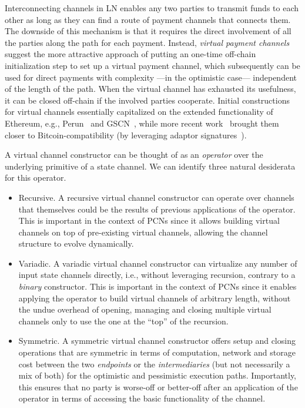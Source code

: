 Interconnecting channels in LN enables any two parties to transmit funds
to each other as long as they can find a route of payment channels that connects
them. The downside of this mechanism is that it requires the direct involvement
of all the parties along the path for each payment. Instead, \emph{virtual payment
channels} suggest the more attractive approach of putting an one-time off-chain
initialization step to set up a virtual payment channel, which subsequently can
be used for direct payments with complexity ---in the optimistic case---
independent of the length of the path. When the virtual channel has exhausted
its usefulness, it can be closed off-chain if the involved parties cooperate.
Initial constructions for virtual channels essentially capitalized on the extended functionality of Ethereum, e.g.,
Perun~\cite{perun} and GSCN~\cite{DBLP:conf/ccs/DziembowskiFH18}, while more
recent work~\cite{9519487} brought them closer to
Bitcoin-compatibility (by leveraging adaptor
signatures~\cite{DBLP:journals/iacr/AumayrEEFHMMR20}).

A virtual channel constructor can be thought of as an \emph{operator} over the
underlying primitive of a state channel. We can identify three natural
desiderata for this operator.

\begin{itemize}
\item Recursive. A recursive virtual channel constructor can operate over
channels that themselves could be the results of previous applications of the
operator. This is important in the context of PCNs since it allows building
virtual channels on top of pre-existing virtual channels, allowing the channel
structure to evolve dynamically.
\item Variadic. A variadic virtual channel constructor can virtualize any number
of input state channels directly, i.e., without leveraging recursion, contrary to a \emph{binary} constructor. This is
important in the context of PCNs since it enables applying the operator to build
virtual channels of arbitrary length, without the undue overhead of opening,
managing and closing multiple virtual channels only to use the one at the
``top'' of the recursion.
\item Symmetric. A symmetric virtual channel constructor offers setup and
closing operations that are symmetric in terms of computation, network and storage cost between the two
\emph{endpoints} or the \emph{intermediaries} (but not necessarily
a mix of both) for the
optimistic and pessimistic execution paths. Importantly, this ensures that no party is worse-off or better-off after an application of the operator in terms of accessing the basic functionality of the channel.
\end{itemize}

